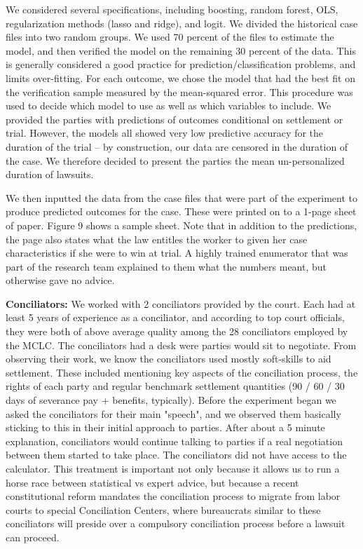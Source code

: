 \documentclass[11pt]{article}
\begin{document}
   We considered several specifications, including boosting, random forest, OLS, regularization methods (lasso and ridge), and logit. We divided the historical case files into two random groups. We used 70 percent of the files to estimate the model, and then verified the model on the remaining 30 percent of the data.  This is generally considered a good practice for prediction/classification problems, and limits over-fitting. For each outcome, we chose the model that had the best fit on the verification sample measured by the mean-squared error. This procedure was used to decide which model to use as well as which variables to include.  We provided the parties with predictions of outcomes conditional on settlement or trial. However, the models all showed very low predictive accuracy for the duration of the trial – by construction, our data are censored in the duration of the case. We therefore decided to present the parties the mean un-personalized duration of lawsuits.
    
   We then inputted the data from the case files that were part of the experiment to produce predicted outcomes for the case. These were printed on to a 1-page sheet of paper. Figure 9 shows a sample sheet. Note that in addition to the predictions, the page also states what the law entitles the worker to given her case characteristics if she were to win at trial.  A highly trained enumerator that was part of the research team explained to them what the numbers meant, but otherwise gave no advice. 

    
     \textbf{Conciliators:} We worked with 2 conciliators provided by the court. Each had at least 5 years of experience as a conciliator, and according to top court officials, they were both of above average quality among the 28 conciliators employed by the MCLC. The conciliators had a desk were parties would sit to negotiate. From observing their work, we know the conciliators used mostly soft-skills to aid settlement. These included mentioning key aspects of the conciliation process, the rights of each party and regular benchmark settlement quantities (90 / 60 / 30 days of severance pay + benefits, typically). Before the experiment began we asked the conciliators for their main "speech", and we observed them basically sticking to this in their initial approach to parties. After about a 5 minute explanation, conciliators would continue talking to parties if a real negotiation between them started to take place. The conciliators did not have access to the calculator. This treatment is important not only because it allows us to run a horse race between statistical vs expert advice, but because a recent constitutional reform mandates the conciliation process to migrate from labor courts to special Conciliation Centers, where bureaucrats similar to these conciliators will preside over a compulsory conciliation process before a lawsuit can proceed. 
     
\end{document}

